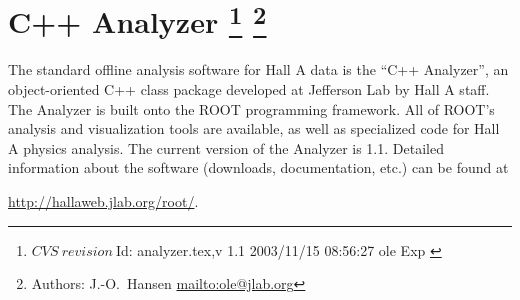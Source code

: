 
\newcommand{\cppaver}{1.1}

\section[C++ Analyzer]{C++ Analyzer
\footnote{
  $CVS~revision~ $Id: analyzer.tex,v 1.1 2003/11/15 08:56:27 ole Exp $ $
}
\footnote{Authors: J.-O.\ Hansen \url{mailto:ole@jlab.org}}
}

The standard offline analysis software for Hall A data is the 
``C++ Analyzer'', an object-oriented C++ class package developed at Jefferson
Lab by Hall A staff. The Analyzer is built onto the 
ROOT programming
framework. All of ROOT's analysis and visualization tools are available,
as well as specialized code for Hall A physics analysis. 
The current version of the Analyzer is \cppaver. Detailed information about the
software (downloads, documentation, etc.) can be found at
\begin{center}
  \url{http://hallaweb.jlab.org/root/}.
\end{center}


